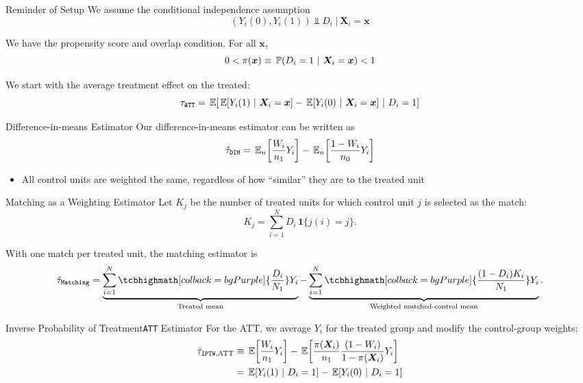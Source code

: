 \documentclass[aspectratio=169,t,11pt,table]{beamer}
\begin{document}
\begin{frame}{Reminder of Setup}
  We assume the conditional independence assumption
  $$
    (Y_{i}(0), Y_{i}(1)) \Perp D_i \ \vert \ \bm{X}_i = \bm{x}
  $$

  We have the propensity score and overlap condition. For all $\bm{x}$,
  $$
    0 < \pi(\bm{x}) \equiv \prob{D_i = 1}{\bm{X}_i = \bm{x}} < 1
  $$

  We start with the average treatment effect on the treated:
  $$
    \tau_{\texttt{ATT}} = \expec{\expec{Y_i(1)}{\bm{X}_i = \bm{x}} - \expec{Y_i(0)}{\bm{X}_i = \bm{x}}}{D_i = 1}
  $$
\end{frame}

\begin{frame}{Difference-in-means Estimator}
  Our difference-in-means estimator can be written as 
  $$
    \hat{\tau}_{\texttt{DIM}} = \expec[n]{\frac{W_i}{n_1} Y_i} - \expec[n]{\frac{1 - W_i}{n_0} Y_i}
  $$
  \begin{itemize}
    \item All control units are weighted the same, regardless of how ``similar'' they are to the treated unit
  \end{itemize}
\end{frame}

\begin{frame}{Matching as a Weighting Estimator}
  Let $K_j$ be the number of treated units for which control unit $j$ is selected as the match:
  $$
    K_j = \sum_{i=1}^N D_i\,\mathbf{1}\{j(i) = j\}.
  $$

  \bigskip
  With one match per treated unit, the matching estimator is
  $$
    \hat{\tau}_{\texttt{Matching}}
    =
    \underbrace{\sum_{i=1}^N \tcbhighmath[colback = bgPurple]{ \frac{D_i}{N_1} } Y_i}_{\text{Treated mean}}
    -
    \underbrace{\sum_{i=1}^N \tcbhighmath[colback = bgPurple]{\frac{(1 - D_i) K_i}{N_1}} Y_i}_{\text{Weighted matched-control mean}}.
  $$
\end{frame}

\begin{frame}{Inverse Probability of Treatment}{\texttt{ATT} Estimator}
  For the ATT, we average $Y_i$ for the treated group and modify the control-group weights:
  \begin{align*}
    \hat{\tau}_{\texttt{IPTW},\text{ATT}}
    &\equiv \expec{\frac{W_i}{n_1} Y_i} - \expec{\frac{\pi(\bm{X}_i)}{n_1} \frac{(1 - W_i)}{1 - \pi(\bm{X}_i)} Y_i} \\
    &= \expec{Y_i(1)}{D_i = 1} - \expec{Y_i(0)}{D_i = 1}
  \end{align*}
\end{frame}
\end{document}
